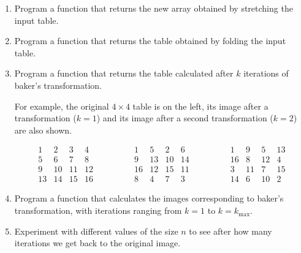 \documentclass[11pt,class=report,crop=false]{standalone}
\begin{document}
\begin{activite}



\begin{enumerate}
  \item Program a  function that returns the new array obtained by \og{}stretching\fg{} the input table.

    \item Program a  function that returns the table obtained by \og{}folding\fg{} the input table.
  
   \item Program a  function that returns the table calculated after $k$ iterations of baker's transformation.
  
  For example, the original $4 \times 4$ table is on the left, its image after a transformation ($k=1$) and its image after a second transformation ($k=2$) are also shown.
  
 $$\begin{array}{cccc} 
  1& 2& 3& 4\\ 
  5& 6& 7& 8\\  
  9&10&11&12\\  
 13&14&15&16  
\end{array}\qquad\qquad  
 \begin{array}{cccc} 
  1& 5& 2& 6\\ 
  9& 13& 10& 14\\  
  16&12&15&11\\  
  8&4&7&3  
\end{array}\qquad\qquad  
 \begin{array}{cccc} 
   1&    9&    5&   13 \\ 
 16&    8&   12&    4\\  
  3&   11&    7&   15\\  
 14&    6&   10&    2
\end{array}
$$ 
  \item Program a   function that calculates the images corresponding to baker's transformation, with iterations ranging from $k=1$ to $k=k_{\max}$.
  
  \item Experiment with different values of the size $n$ to see after how many iterations we get back to the original image. 
  

\end{enumerate}
\end{activite}
\end{document}
